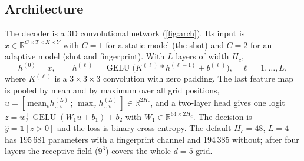 \documentclass[11pt,a4paper]{article}
\DeclareMathOperator{\GELU}{GELU}
\newcommand{\R}{\mathbb{R}}
\begin{document}
\subsection{Architecture}\label{sec:arch}
The decoder is a 3D convolutional network (\cref{fig:arch}). Its input is $x\in\R^{C\times T\times X\times Y}$ with
$C=1$ for a static model (the shot) and $C=2$ for an adaptive model (shot and fingerprint). With $L$ layers of
width $H_c$,
\begin{equation}
  h^{(0)}=x,\qquad h^{(\ell)}=\GELU\bigl(K^{(\ell)}*h^{(\ell-1)}+b^{(\ell)}\bigr),\quad \ell=1,\dots,L,
\end{equation}
where $K^{(\ell)}$ is a $3\times3\times3$ convolution with zero padding. The last feature map is pooled by mean
and by maximum over all grid positions, $u=[\,\mathrm{mean}_v h^{(L)}_{:,v}\,;\,\max_v h^{(L)}_{:,v}\,]\in\R^{2H_c}$,
and a two-layer head gives one logit $z=w_2^{\top}\GELU(W_1u+b_1)+b_2$ with $W_1\in\R^{64\times2H_c}$. The
decision is $\hat y=\mathbf 1[z>0]$ and the loss is binary cross-entropy. The default $H_c=48$, $L=4$ has 195\,681
parameters with a fingerprint channel and 194\,385 without; after four layers the receptive field ($9^3$) covers
the whole $d=5$ grid.
\end{document}
